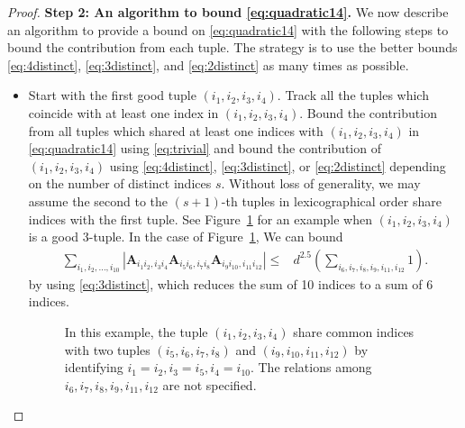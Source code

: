 \documentclass[twoside,11pt]{article}
\def\bA{{\boldsymbol A}}
\newcommand{\1}{\mathbf{1}}
\begin{document}
\begin{proof}
 

\textbf{Step 2: An algorithm to bound \eqref{eq:quadratic14}.} We now describe an algorithm to provide a bound on \eqref{eq:quadratic14} with the following steps to bound the contribution from each tuple. The strategy is to use the better bounds \eqref{eq:4distinct}, \eqref{eq:3distinct}, and \eqref{eq:2distinct} as many times as possible. 
\begin{itemize}
    \item Start with the first good tuple $(i_1,i_2,i_3,i_4)$. Track all the tuples which coincide with at least one index in $(i_1,i_2,i_3,i_4)$. 
 Bound the contribution from all tuples which shared at least one indices with $(i_1,i_2,i_3,i_4)$ in \eqref{eq:quadratic14} using \eqref{eq:trivial} and bound the contribution of $(i_1,i_2,i_3,i_4)$ using \eqref{eq:4distinct}, \eqref{eq:3distinct}, or \eqref{eq:2distinct} depending on the number of distinct indices $s$. Without loss of generality, we may assume the second to the $(s+1)$-th tuples in lexicographical order share indices with the first tuple.
 See Figure~\ref{fig:good_3} for an example when $(i_1,i_2,i_3,i_4)$ is a good 3-tuple. In the case of Figure~\ref{fig:good_3}, We can bound \begin{align}
\sum_{i_1,i_2,\dots,i_{10}}|\bA_{i_1i_2,i_3i_4}\bA_{i_5i_6,i_7i_8}\bA_{i_9i_{10},i_{11}i_{12}}|
\leq & d^{2.5} \left(\sum_{i_6,i_7,i_8,i_9,i_{11},i_{12}} 1\right).
\end{align}
by using \eqref{eq:3distinct}, which reduces the sum of 10 indices to a sum of 6 indices.

\begin{figure}
\centering
\caption{In this example, the tuple $(i_1,i_2,i_3,i_4)$ share common indices with two tuples $(i_5,i_6,i_7,i_8)$ and $(i_9,i_{10},i_{11},i_{12})$ by identifying $i_1=i_2, i_3=i_{5},i_4=i_{10}$. The relations among $i_6,i_7,i_8,i_9,i_{11},i_{12}$ are not specified.}  
\label{fig:good_3}
\end{figure}



\end{itemize}
\end{proof}
\end{document}
